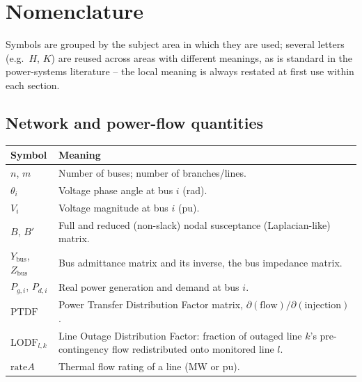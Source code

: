 \documentclass[11pt]{report}
\theoremstyle{plain}
\theoremstyle{definition}
\theoremstyle{remark}
\begin{document}
\chapter{Nomenclature}
\label{ch:nomenclature}

Symbols are grouped by the subject area in which they are used; several
letters (e.g.\ $H$, $K$) are reused across areas with different meanings,
as is standard in the power-systems literature -- the local meaning is
always restated at first use within each section.

\section{Network and power-flow quantities}
\begin{longtable}{@{}p{3cm}p{11.5cm}@{}}
\toprule
Symbol & Meaning \\
\midrule
\endhead
$n$, $m$ & Number of buses; number of branches/lines. \\
$\theta_i$ & Voltage phase angle at bus $i$ (rad). \\
$V_i$ & Voltage magnitude at bus $i$ (pu). \\
$B$, $B'$ & Full and reduced (non-slack) nodal susceptance (Laplacian-like) matrix. \\
$Y_{\text{bus}}$, $Z_{\text{bus}}$ & Bus admittance matrix and its inverse, the bus impedance matrix. \\
$P_{g,i}$, $P_{d,i}$ & Real power generation and demand at bus $i$. \\
$\text{PTDF}$ & Power Transfer Distribution Factor matrix, $\partial(\text{flow})/\partial(\text{injection})$. \\
$\text{LODF}_{l,k}$ & Line Outage Distribution Factor: fraction of outaged line $k$'s pre-contingency flow redistributed onto monitored line $l$. \\
$\text{rate}A$ & Thermal flow rating of a line (MW or pu). \\
\bottomrule
\end{longtable}
\end{document}
